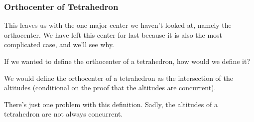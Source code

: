 \subsubsection{Orthocenter of Tetrahedron}
This leaves us with the one major center we haven't looked at, namely the orthocenter. We have left this center for last because it is also the most complicated case, and we'll see why.

If we wanted to define the orthocenter of a tetrahedron, how would we define it?







We would define the orthocenter of a tetrahedron as the intersection of the altitudes (conditional on the proof that the altitudes are concurrent).

There's just one problem with this definition. Sadly, the altitudes of a tetrahedron are not always concurrent.




